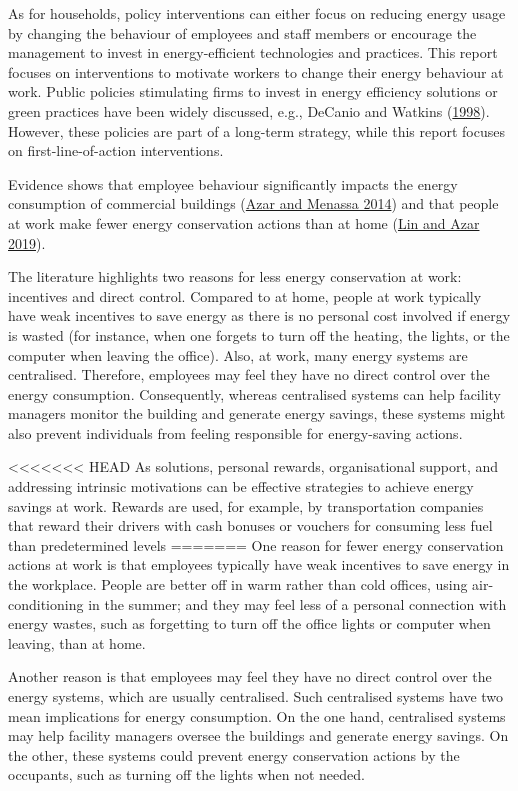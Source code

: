 \documentclass[
  12pt,
  captions=heading]{scrreport}
\begin{document}
As for households, policy interventions can either focus on reducing
energy usage by changing the behaviour of employees and staff members or
encourage the management to invest in energy-efficient technologies and
practices. This report focuses on interventions to motivate workers to
change their energy behaviour at work. Public policies stimulating firms
to invest in energy efficiency solutions or green practices have been
widely discussed, e.g., DeCanio and Watkins
(\protect\hyperlink{ref-decanio1998investment}{1998}). However, these
policies are part of a long-term strategy, while this report focuses on
first-line-of-action interventions.

Evidence shows that employee behaviour significantly impacts the energy
consumption of commercial buildings
(\protect\hyperlink{ref-azar2014comprehensive}{Azar and Menassa 2014})
and that people at work make fewer energy conservation actions than at
home (\protect\hyperlink{ref-lin2019mixing}{Lin and Azar 2019}).

The literature highlights two reasons for less energy conservation at
work: incentives and direct control. Compared to at home, people at work
typically have weak incentives to save energy as there is no personal
cost involved if energy is wasted (for instance, when one forgets to
turn off the heating, the lights, or the computer when leaving the
office). Also, at work, many energy systems are centralised. Therefore,
employees may feel they have no direct control over the energy
consumption. Consequently, whereas centralised systems can help facility
managers monitor the building and generate energy savings, these systems
might also prevent individuals from feeling responsible for
energy-saving actions.

<<<<<<< HEAD
As solutions, personal rewards, organisational support, and addressing
intrinsic motivations can be effective strategies to achieve energy
savings at work. Rewards are used, for example, by transportation
companies that reward their drivers with cash bonuses or vouchers for
consuming less fuel than predetermined levels
=======
One reason for fewer energy conservation actions at work is that
employees typically have weak incentives to save energy in the
workplace. People are better off in warm rather than cold offices, using
air-conditioning in the summer; and they may feel less of a personal
connection with energy wastes, such as forgetting to turn off the office
lights or computer when leaving, than at home.

Another reason is that employees may feel they have no direct control
over the energy systems, which are usually centralised. Such centralised
systems have two mean implications for energy consumption. On the one
hand, centralised systems may help facility managers oversee the
buildings and generate energy savings. On the other, these systems could
prevent energy conservation actions by the occupants, such as turning
off the lights when not needed.
\end{document}
